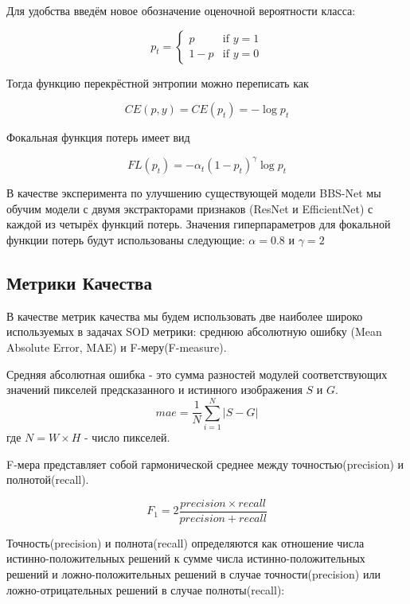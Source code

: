 Для удобства введём новое обозначение оценочной вероятности класса:

\begin{equation}
    p_t=\begin{cases}
        p & \text{if }y=1\\
        1-p & \text{if }y=0
     \end{cases}
\end{equation}

Тогда функцию перекрёстной энтропии можно переписать как

\begin{equation}
    CE(p,y) = CE(p_t) = -\log{p_t}
\end{equation}

Фокальная функция потерь имеет вид

\begin{equation}
    FL(p_t) = -\alpha_t(1-p_t)^{\gamma}\log{p_t}
\end{equation}

В качестве эксперимента по улучшению существующей модели BBS-Net\cite{BBS} мы обучим модели с двумя экстракторами признаков
(ResNet и EfficientNet) с каждой из четырёх функций потерь.
Значения гиперпараметров для фокальной функции потерь будут использованы следующие: $\alpha=0.8$ и $\gamma=2$


\subsection{Метрики Качества}

В качестве метрик качества мы будем использовать две наиболее широко используемых в задачах SOD метрики:
среднюю абсолютную ошибку (Mean Absolute Error, MAE) и F-меру(F-measure).

Средняя абсолютная ошибка - это сумма разностей
модулей соответствующих значений пикселей предсказанного
 и истинного изображения $S$ и $G$.
\begin{equation}
    mae = \frac{1}{N}\sum_{i=1}^N|S - G|
\end{equation}
где $N = W\times H$ - число пикселей.


F-мера представляет собой гармонической среднее
между точностью(precision) и полнотой(recall).

\begin{equation}
    F_1 = 2\frac{precision \times recall}{precision + recall}
\end{equation}

Точность(precision) и полнота(recall) определяются
как отношение числа истинно-положительных решений к сумме
числа истинно-положительных решений и ложно-положительных решений в случае
точности(precision) или ложно-отрицательных решений в случае
полноты(recall):

